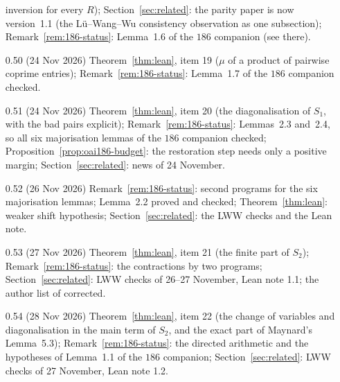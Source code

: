 \documentclass[11pt]{amsart}
\theoremstyle{definition}
\theoremstyle{remark}
\begin{document}
\begin{itemize}
inversion for every $R$); Section~\ref{sec:related}: the parity paper is now version~1.1 (the
L\"u--Wang--Wu consistency observation as one subsection); Remark~\ref{rem:186-status}: Lemma~1.6
of the $186$ companion (see there).
\item[0.50] (24 Nov 2026) Theorem~\ref{thm:lean}, item 19 ($\mu$ of a product of pairwise coprime
entries); Remark~\ref{rem:186-status}: Lemma~1.7 of the $186$ companion checked.
\item[0.51] (24 Nov 2026) Theorem~\ref{thm:lean}, item 20 (the diagonalisation of $S_1$, with the bad pairs
explicit); Remark~\ref{rem:186-status}: Lemmas~2.3 and~2.4, so all six majorisation lemmas of the $186$ companion
checked; Proposition~\ref{prop:oai186-budget}: the restoration step needs only a positive margin;
Section~\ref{sec:related}: news of 24 November.
\item[0.52] (26 Nov 2026) Remark~\ref{rem:186-status}: second programs for the six majorisation
lemmas; Lemma~2.2 proved and checked; Theorem~\ref{thm:lean}: weaker shift hypothesis; Section~\ref{sec:related}: the LWW checks and the
Lean note.
\item[0.53] (27 Nov 2026) Theorem~\ref{thm:lean}, item 21 (the finite part of $S_2$); Remark~\ref{rem:186-status}: the
contractions by two programs; Section~\ref{sec:related}: LWW checks of 26--27 November, Lean note 1.1; the author list of \cite{Axiom26} corrected.
\item[0.54] (28 Nov 2026) Theorem~\ref{thm:lean}, item 22 (the change of variables and diagonalisation
in the main term of $S_2$, and the exact part of Maynard's Lemma~5.3); Remark~\ref{rem:186-status}: the directed arithmetic and the hypotheses of Lemma~1.1 of the
$186$ companion; Section~\ref{sec:related}: LWW checks of 27 November, Lean note 1.2.
\end{itemize}
\end{document}
